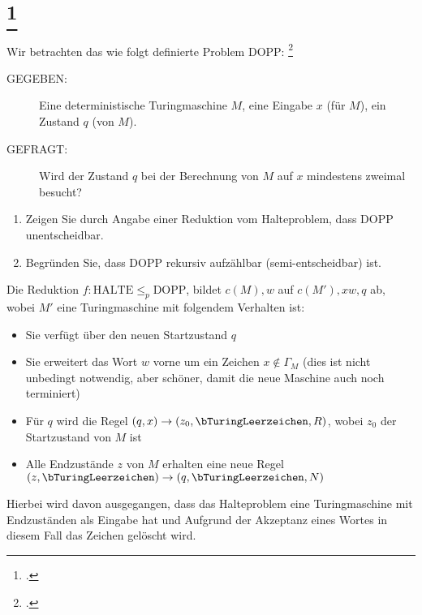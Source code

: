 \documentclass{bschlangaul-aufgabe}
\begin{document}
\section{
\footcite{examen:66115:2013:09}}

Wir betrachten das wie folgt definierte Problem DOPP:
\footcite[Aufgabe 8]{theo:ab:4}

\begin{description}
\item[GEGEBEN:]

Eine deterministische Turingmaschine $M$, eine Eingabe $x$ (für $M$),
ein Zustand $q$ (von $M$).

\item[GEFRAGT:]

Wird der Zustand $q$ bei der Berechnung von $M$ auf $x$ mindestens
zweimal besucht?
\end{description}

\begin{enumerate}


\item Zeigen Sie durch Angabe einer Reduktion vom Halteproblem, dass
DOPP unentscheidbar.

\item Begründen Sie, dass DOPP rekursiv aufzählbar (semi-entscheidbar)
ist.

\end{enumerate}

Die Reduktion $f \colon \text{HALTE} \leq_p \text{DOPP}$, bildet $c(M),
w$ auf $c(M'), xw, q$ ab, wobei $M'$ eine Turingmaschine mit folgendem
Verhalten ist:

\begin{itemize}
\item Sie verfügt über den neuen Startzustand $q$

\item Sie erweitert das Wort $w$ vorne um ein Zeichen $x \notin
\Gamma_M$ (dies ist nicht unbedingt notwendig, aber schöner, damit die
neue Maschine auch noch terminiert)

\item Für $q$ wird die Regel $(q, x) \rightarrow (z_0,
\bTuringLeerzeichen, R)$, wobei $z_0$ der Startzustand von $M$ ist

\item Alle Endzustände $z$ von $M$ erhalten eine neue Regel $(z,
\bTuringLeerzeichen) \rightarrow (q, \bTuringLeerzeichen, N)$
\end{itemize}

Hierbei wird davon ausgegangen, dass das Halteproblem eine
Turingmaschine mit Endzuständen als Eingabe hat und Aufgrund der
Akzeptanz eines Wortes in diesem Fall das Zeichen gelöscht wird.
\end{document}
